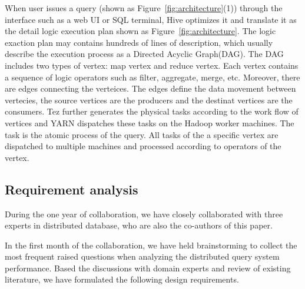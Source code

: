 When user issues a query (shown as Figure~\ref{fig:architecture}(1)) through the interface such as a web UI or SQL terminal, Hive optimizes it and translate it as the detail logic execution plan shown as Figure~\ref{fig:architecture}. The logic exaction plan may contains hundreds of lines of description, which usually describe the execution process as a Directed Acyclic Graph(DAG). The DAG includes two types of vertex: map vertex and reduce vertex. Each vertex contains a sequence of logic operators such as filter, aggregate, merge, etc. Moreover, there are edges connecting the verteices. The edges define the data movement between vertecies, the source vertices are the producers and the destinat vertices are the consumers.
Tez further generates the physical tasks according to the work flow of vertices and YARN dispatches these tasks on the Hadoop worker machines.  The task is the atomic process of the query. All tasks of the a specific vertex are dispatched to multiple machines and processed according to operators of the vertex.  

\subsection{Requirement analysis}
During the one year of collaboration, we have closely collaborated with three experts in distributed database, who are also the co-authors of this paper.

In the first month of the collaboration, we have held brainstorming to collect the most frequent raised questions when analyzing the distributed query system performance. Based the discussions with domain experts and review of existing literature, we have formulated the following design requirements.



